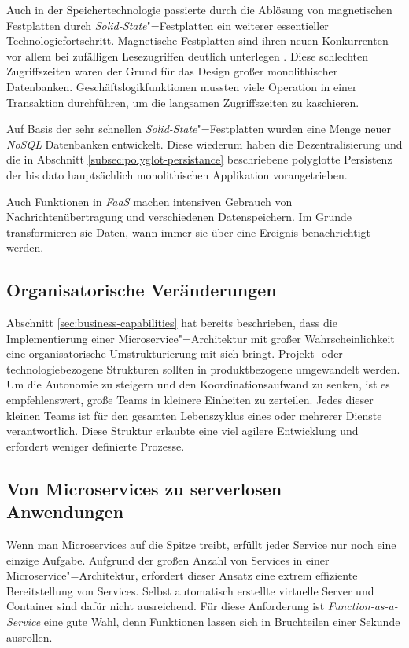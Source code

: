 Auch in der Speichertechnologie passierte durch die Ablösung von magnetischen Festplatten durch \textit{Solid-State}"=Festplatten ein weiterer essentieller Technologiefortschritt. Magnetische Festplatten sind ihren neuen Konkurrenten vor allem bei zufälligen Lesezugriffen deutlich unterlegen \cite{Regola:2012:CMV:2379436.2379437}. Diese schlechten Zugriffszeiten waren der Grund für das Design großer monolithischer Datenbanken. Geschäftslogikfunktionen mussten viele Operation in einer Transaktion durchführen, um die langsamen Zugriffszeiten zu kaschieren.

Auf Basis der sehr schnellen \textit{Solid-State}"=Festplatten wurden eine Menge neuer \textit{NoSQL} Datenbanken entwickelt. Diese wiederum haben die Dezentralisierung und die in Abschnitt \ref{subsec:polyglot-persistance} beschriebene polyglotte Persistenz der bis dato hauptsächlich monolithischen Applikation vorangetrieben.

Auch Funktionen in \textit{FaaS} machen intensiven Gebrauch von Nachrichtenübertragung und verschiedenen Datenspeichern. Im Grunde transformieren sie Daten, wann immer sie über eine Ereignis benachrichtigt werden.

\subsection{Organisatorische Veränderungen}

Abschnitt \ref{sec:business-capabilities} hat bereits beschrieben, dass die Implementierung einer Microservice"=Architektur mit großer Wahrscheinlichkeit eine organisatorische Umstrukturierung mit sich bringt. Projekt- oder technologiebezogene Strukturen sollten in produktbezogene umgewandelt werden. Um die Autonomie zu steigern und den Koordinationsaufwand zu senken, ist es empfehlenswert, große Teams in kleinere Einheiten zu zerteilen. Jedes dieser kleinen Teams ist für den gesamten Lebenszyklus eines oder mehrerer Dienste verantwortlich. Diese Struktur erlaubte eine viel agilere Entwicklung und erfordert weniger definierte Prozesse.

\subsection{Von Microservices zu serverlosen Anwendungen}

Wenn man Microservices auf die Spitze treibt, erfüllt jeder Service nur noch eine einzige Aufgabe. Aufgrund der großen Anzahl von Services in einer Microservice"=Architektur, erfordert dieser Ansatz eine extrem effiziente Bereitstellung von Services. Selbst automatisch erstellte virtuelle Server und Container sind dafür nicht ausreichend. Für diese Anforderung ist \textit{Function-as-a-Service} eine gute Wahl, denn Funktionen lassen sich in Bruchteilen einer Sekunde ausrollen.


